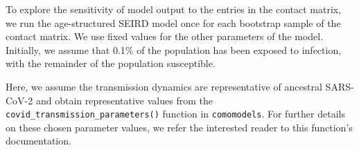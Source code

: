 \documentclass[
]{article}
\newenvironment{Shaded}{\begin{snugshade}}{\end{snugshade}}
\newcommand{\AttributeTok}[1]{\textcolor[rgb]{0.77,0.63,0.00}{#1}}
\newcommand{\CommentTok}[1]{\textcolor[rgb]{0.56,0.35,0.01}{\textit{#1}}}
\newcommand{\ConstantTok}[1]{\textcolor[rgb]{0.00,0.00,0.00}{#1}}
\newcommand{\DecValTok}[1]{\textcolor[rgb]{0.00,0.00,0.81}{#1}}
\newcommand{\FunctionTok}[1]{\textcolor[rgb]{0.00,0.00,0.00}{#1}}
\newcommand{\NormalTok}[1]{#1}
\newcommand{\OtherTok}[1]{\textcolor[rgb]{0.56,0.35,0.01}{#1}}
\newcommand{\SpecialCharTok}[1]{\textcolor[rgb]{0.00,0.00,0.00}{#1}}
\begin{document}
To explore the sensitivity of model output to the entries in the contact
matrix, we run the age-structured SEIRD model once for each bootstrap
sample of the contact matrix. We use fixed values for the other
parameters of the model. Initially, we assume that 0.1\% of the
population has been exposed to infection, with the remainder of the
population susceptible.

Here, we assume the transmission dynamics are representative of
ancestral SARS-CoV-2 and obtain representative values from the
\texttt{covid\_transmission\_parameters()} function in
\texttt{comomodels}. For further details on these chosen parameter
values, we refer the interested reader to this function's documentation.

\begin{Shaded}
\end{Shaded}
\end{document}
